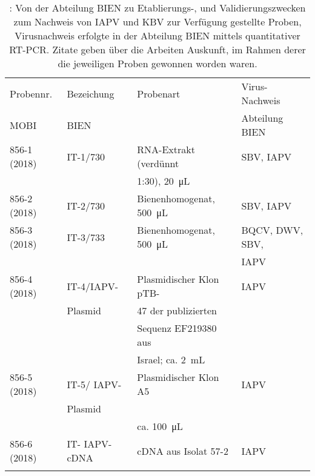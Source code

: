 \begin{table}
    \centering
    \caption{: Von der Abteilung BIEN zu Etablierungs-, und Validierungszwecken zum Nachweis von IAPV und KBV zur Verfügung gestellte Proben, Virusnachweis erfolgte in der Abteilung BIEN mittels quantitativer RT-PCR. Zitate geben über die Arbeiten Auskunft, im Rahmen derer die jeweiligen Proben gewonnen worden waren.}
    \label{tab:e:validierung}
    \begin{tabular}{|l|l|l|l|}
        \hline
        Probennr.       &   Bezeichung          & Probenart                 & Virus- Nachweis\\
        MOBI            &   BIEN                &                           & Abteilung BIEN\\
        \hline
        856-1 (2018)    & IT-1/730              & RNA-Extrakt (verdünnt     & SBV, IAPV\\ 
                        &                       & 1:30), \SI{20}{\micro\liter}  &\\
        \hline
        856-2 (2018)    & IT-2/730              & Bienenhomogenat, \SI{500}{\micro\liter} & SBV, IAPV\\ 
        \hline
        856-3 (2018)    & IT-3/733              & Bienenhomogenat, \SI{500}{\micro\liter} & BQCV, DWV, SBV,\\
                        &                       &                           & IAPV\\
        \hline
        856-4 (2018)    & IT-4/IAPV-            & Plasmidischer Klon pTB-   & IAPV\\
                        & Plasmid               & 47 der publizierten       &\\
                        &                       & Sequenz EF219380 aus      &\\
                        &                        & Israel; ca. \SI{2}{\milli\liter} &\\
        \hline
        856-5 (2018)    & IT-5/ IAPV-           & Plasmidischer Klon A5     & IAPV\\
                        & Plasmid               & \citep{blanchard2008}     &\\
                        &                       & ca. \SI{100}{\micro\liter} &\\ 
        \hline
        856-6 (2018)    & IT- IAPV- cDNA        & cDNA aus Isolat 57-2      & IAPV\\
                        &                       & \citep{blanchard2008}     &\\

\end{tabular}
\end{table}
